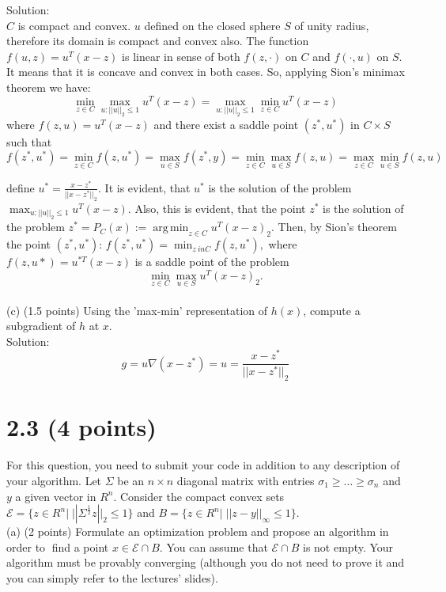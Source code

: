 \documentclass{article}
\begin{document}
Solution: \\
$C$ is compact and convex. $u$ defined on the closed sphere $S$ of unity radius, therefore its domain is compact and convex also. The function $f(u, z) = u^T(x - z)$ is linear 
in sense of both $f(z, \cdot)$ on $C$ and $f(\cdot, u)$ 
on $S.$ It means that it is concave and convex in both cases. So, applying Sion's minimax theorem  we have:\\
$$
\min_{z \in C} \max_{u:||u||_2 \leq 1} u^T(x - z) = 
\max_{u:||u||_2 \leq 1} \min_{z \in C} u^T(x - z)
$$
where ${f(z, u) = u^T(x - z)}$
and there exist a saddle point $(z^*, u^*)$ in $C \times S$
such that 
$$
f(z^*, u^*) = \min_{z \in C} f(z, u^*) = 
\max_{u \in S} f(z^*, y) = \min_{z \in C} \max_{u \in S} f(z, u) = \max_{z \in C} \min_{u \in S}  f(z, u)
$$

define $u^* = \frac{x - z^*}{||x - z^*||_2}.$ It is evident, that $u^*$ is the solution of the problem 
$\max_{u:||u||_2 \leq 1} u^T(x - z).$ Also, this is evident, that the point $z^*$ is the solution of the problem 
${z^* = P_C(x) := \operatorname*{arg\,min}_{z \in C}
	u^T(x - z)_2}.$ 
Then, by Sion's theorem the point 
${(z^*, u^*): \, f(z^*, u^*)} = \min_{z \ in C} f(z, u^*),$
where ${f(z, u*) = u^{*T}(x - z)}$
is a saddle point of the problem 
$$
\min_{z \in C} \max_{u \in S} u^T(x - z)_2.
$$
\\

(c) (1.5 points) Using the 'max-min' representation of $h(x)$, compute a subgradient of $h$ at $x$.
\\

Solution:
$$
g = u \nabla (x - z^*) = u = \frac{x - z^*}{||x - z^*||_2}
$$

\section*{2.3 (4 points)} 

For this question, you need to submit your code in addition to any description
of your algorithm. Let $\Sigma$ be an $n \times n$ diagonal matrix with entries 
$\sigma_1 \geq \dots \geq \sigma_n$ and $y$ a given vector 
in $R^n.$ Consider the compact convex sets 
$\mathcal{E} = \{z \in R^n|\; 
||\Sigma ^{\frac{1}{2} } z||_2 \leq 1\}$
and $B=\{z \in R^n|\; ||z-y||_{\infty} \leq 1 \}.$ \\

(a) (2 points) Formulate an optimization problem and propose an algorithm in order to find a point
$x \in \mathcal{E} \cap B.$ You can assume that $\mathcal{E} \cap B$ is not empty. Your algorithm must be provably converging (although you do not need to prove it and you can simply refer to the lectures' slides).\\
\end{document}
